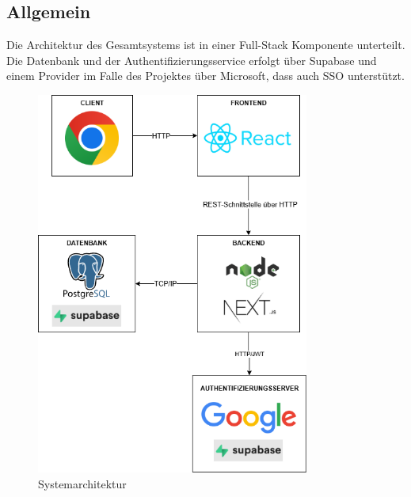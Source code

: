 \documentclass[a4paper,12pt]{article}
\begin{document}
\subsection{Allgemein}
Die Architektur des Gesamtsystems ist in einer Full-Stack Komponente unterteilt. Die Datenbank und der Authentifizierungsservice erfolgt über Supabase und einem Provider im Falle des Projektes über Microsoft, dass auch SSO unterstützt.
\begin{figure}[H]
  \centering
  \includegraphics[width=0.8\textwidth]{Abbildungen/Systemarchitektur.png}
  \caption{Systemarchitektur}
  \label{fig:systemarchitektur}
\end{figure}

\newpage

\end{document}
